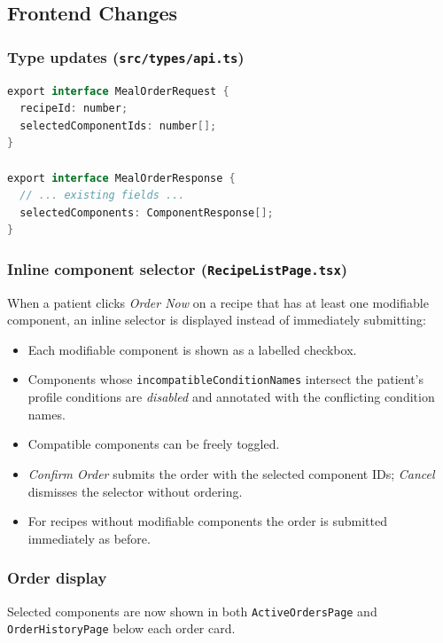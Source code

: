 \documentclass[12pt,a4paper]{article}
\begin{document}
\subsection{Frontend Changes}

\subsubsection{Type updates (\texttt{src/types/api.ts})}
\begin{lstlisting}[language=Java, caption={Updated TypeScript interfaces}]
export interface MealOrderRequest {
  recipeId: number;
  selectedComponentIds: number[];
}

export interface MealOrderResponse {
  // ... existing fields ...
  selectedComponents: ComponentResponse[];
}
\end{lstlisting}

\subsubsection{Inline component selector (\texttt{RecipeListPage.tsx})}
When a patient clicks \emph{Order Now} on a recipe that has at least one
modifiable component, an inline selector is displayed instead of immediately
submitting:
\begin{itemize}[noitemsep]
  \item Each modifiable component is shown as a labelled checkbox.
  \item Components whose \texttt{incompatibleConditionNames} intersect the
        patient's profile conditions are \emph{disabled} and annotated with the
        conflicting condition names.
  \item Compatible components can be freely toggled.
  \item \emph{Confirm Order} submits the order with the selected component IDs;
        \emph{Cancel} dismisses the selector without ordering.
  \item For recipes without modifiable components the order is submitted
        immediately as before.
\end{itemize}

\subsubsection{Order display}
Selected components are now shown in both \texttt{ActiveOrdersPage} and
\texttt{OrderHistoryPage} below each order card.

\end{document}
